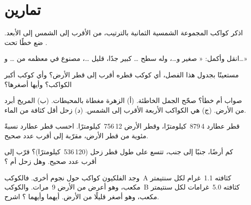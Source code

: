 \section{تمارين}

\begin{exercise}[$\star$]\label{exo:g6:earth-a-planet:1}
اذكر كواكب المجموعة الشمسية الثمانية بالترتيب، من الأقرب إلى
الشمس إلى الأبعد. ضع خطًا تحت .
\end{exercise}

\begin{exercise}[$\star$]\label{exo:g6:earth-a-planet:2}
انقل وأكمل: « صغير و\ldots، وله سطح
\ldots{}  كبير جدًا، قليل \ldots، مصنوع في معظمه من
\ldots{} و\ldots{}»
\end{exercise}

\begin{exercise}[$\star$]\label{exo:g6:earth-a-planet:3}
مستعينًا بجدول هذا الفصل، أي كوكب قطره أقرب إلى
قطر الأرض؟ وأي كوكب أكبر الكواكب؟ وأيها أصغرها؟
\end{exercise}

\begin{exercise}[$\star$]\label{exo:g6:earth-a-planet:4}
صواب أم خطأ؟ صحّح الجمل الخاطئة.
(أ) الزهرة مغطاة بالمحيطات.
(ب) المريخ أبرد من الأرض.
(ج)  هي الكواكب الأربعة الأقرب إلى الشمس.
(د) زحل أقل كثافة من الماء.
\end{exercise}

\begin{exercise}[$\star\star$]\label{exo:g6:earth-a-planet:5}
قطر عطارد 4\,879~كيلومترًا، وقطر الأرض
12\,756~كيلومترًا. احسب قطر عطارد نسبةً مئوية من قطر
الأرض، مقرّبة إلى أقرب عدد صحيح.
\end{exercise}

\begin{exercise}[$\star\star$]\label{exo:g6:earth-a-planet:6}
كم أرضًا، جنبًا إلى جنب، تتسع على طول قطر زحل
(120\,536~كيلومترًا)؟ قرّب إلى أقرب عدد صحيح. وهل زحل 
أم ؟
\end{exercise}

\begin{exercise}[$\star\star$]\label{exo:g6:earth-a-planet:7}
وجد الفلكيون كواكب حول نجوم أخرى. فالكوكب~A كثافته
1.1~غرام لكل سنتيمتر مكعب، وهو أعرض من الأرض 9~مرات.
والكوكب~B كثافته 5.0~غرامات لكل سنتيمتر مكعب، وهو أصغر
قليلًا من الأرض. أيهما  وأيهما ؟ اشرح.
\end{exercise}

